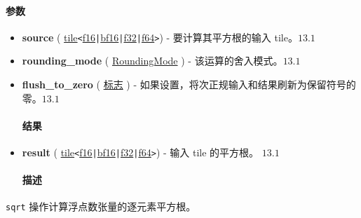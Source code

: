 \documentclass{article}
\begin{document}
\paragraph{参数}


\begin{itemize}
\item \textbf{source} ( \href{https://docs.nvidia.com/cuda/tile-ir/latest/sections/types.html#type-tile}{tile}\texttt{<}\href{https://docs.nvidia.com/cuda/tile-ir/latest/sections/types.html#subsection-element-types}{f16}\texttt{|}\href{https://docs.nvidia.com/cuda/tile-ir/latest/sections/types.html#subsection-element-types}{bf16}\texttt{|}\href{https://docs.nvidia.com/cuda/tile-ir/latest/sections/types.html#subsection-element-types}{f32}\texttt{|}\href{https://docs.nvidia.com/cuda/tile-ir/latest/sections/types.html#subsection-element-types}{f64}\texttt{>}) - 要计算其平方根的输入 tile。$\boxed{13.1}$
\item \textbf{rounding\_mode} ( \href{https://docs.nvidia.com/cuda/tile-ir/latest/sections/operations.html#op-attribute-cuda-tile-sqrt-roundingmode-attr}{RoundingMode} ) - 该运算的舍入模式。$\boxed{13.1}$
\item \textbf{flush\_to\_zero} ( \href{https://docs.nvidia.com/cuda/tile-ir/latest/sections/operations.html#type-flag}{标志} ) - 如果设置，将次正规输入和结果刷新为保留符号的零。$\boxed{13.1}$




\paragraph{结果}


\item \textbf{result} ( \href{https://docs.nvidia.com/cuda/tile-ir/latest/sections/types.html#type-tile}{tile}\texttt{<}\href{https://docs.nvidia.com/cuda/tile-ir/latest/sections/types.html#subsection-element-types}{f16}\texttt{|}\href{https://docs.nvidia.com/cuda/tile-ir/latest/sections/types.html#subsection-element-types}{bf16}\texttt{|}\href{https://docs.nvidia.com/cuda/tile-ir/latest/sections/types.html#subsection-element-types}{f32}\texttt{|}\href{https://docs.nvidia.com/cuda/tile-ir/latest/sections/types.html#subsection-element-types}{f64}\texttt{>}) - 输入 tile 的平方根。 $\boxed{13.1}$




\paragraph{描述}


\end{itemize}
\texttt{sqrt} 操作计算浮点数张量的逐元素平方根。
\end{document}
